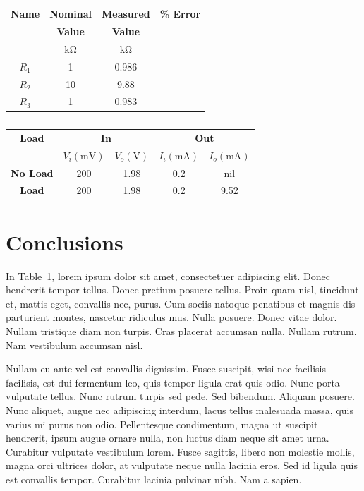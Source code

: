 \documentclass{article}
\begin{document}
\begin{table}[h]
  \label{tab:table_01}
  \centering
  \begin{tabular}{*{4}{c}}
    \textbf{Name} & \textbf{Nominal} & \textbf{Measured} & \textbf{\% Error} \\
    & \textbf{Value} & \textbf{Value} \\
    & $\si{\kilo\ohm}$ & $\si{\kilo\ohm}$ & \\
    \hline
    $R_1$ & 1 & 0.986 & \\
    $R_2$ & 10 & 9.88 & \\
    $R_3$ & 1 & 0.983 & \\
  \end{tabular}
  \caption{}
\end{table}

\begin{table}[h]
  \label{tab:table_02}
  \centering
  \begin{tabular}{*{5}{c}}
    \textbf{Load} & \multicolumn{2}{c}{\textbf{In}} & \multicolumn{2}{c}{\textbf{Out}} \\
    & $V_i (\si{\milli\volt})$ & $V_o (\si{\volt})$ & $I_i (\si{\milli\ampere})$ & $I_o (\si{\milli\ampere})$ \\
    \hline
    \textbf{No Load} & 200 & 1.98 & 0.2 & nil \\
    \textbf{Load} & 200 & 1.98 & 0.2 & 9.52 \\
  \end{tabular}
  \caption{}
\end{table}

\section{Conclusions}
\label{sec:conclusion}

In Table~\ref{tab:table_01}, lorem ipsum dolor sit amet, consectetuer
adipiscing elit. Donec hendrerit tempor tellus. Donec pretium posuere
tellus. Proin quam nisl, tincidunt et, mattis eget, convallis nec,
purus. Cum sociis natoque penatibus et magnis dis parturient montes,
nascetur ridiculus mus. Nulla posuere. Donec vitae dolor. Nullam
tristique diam non turpis. Cras placerat accumsan nulla. Nullam
rutrum. Nam vestibulum accumsan nisl.

Nullam eu ante vel est convallis dignissim. Fusce suscipit, wisi nec
facilisis facilisis, est dui fermentum leo, quis tempor ligula erat
quis odio. Nunc porta vulputate tellus. Nunc rutrum turpis sed
pede. Sed bibendum. Aliquam posuere. Nunc aliquet, augue nec
adipiscing interdum, lacus tellus malesuada massa, quis varius mi
purus non odio. Pellentesque condimentum, magna ut suscipit hendrerit,
ipsum augue ornare nulla, non luctus diam neque sit amet
urna. Curabitur vulputate vestibulum lorem. Fusce sagittis, libero non
molestie mollis, magna orci ultrices dolor, at vulputate neque nulla
lacinia eros. Sed id ligula quis est convallis tempor. Curabitur
lacinia pulvinar nibh. Nam a sapien.
\end{document}
